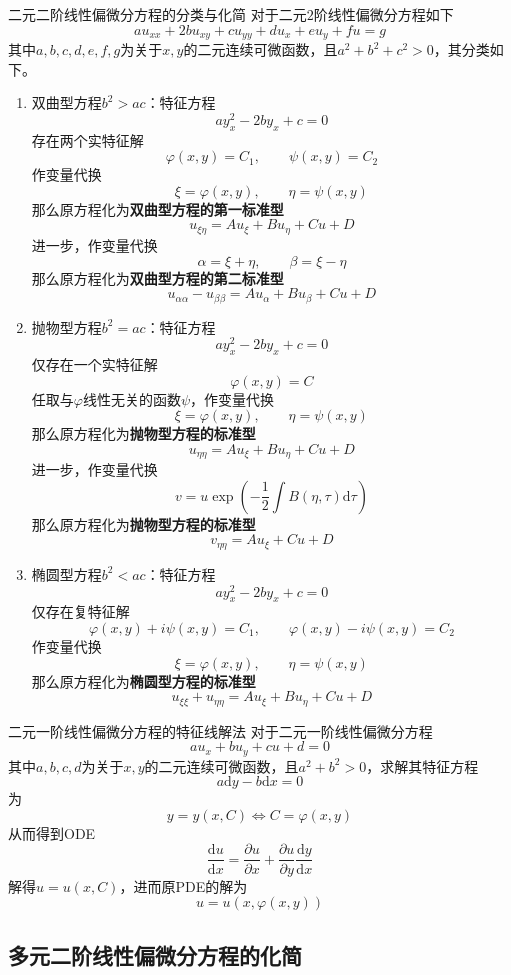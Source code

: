 \documentclass[lang = cn, scheme = chinese, thmcnt = section]{elegantbook}
\newcommand{\dd}{\mathrm{d}}           %
\begin{document}
\begin{theorem}{二元二阶线性偏微分方程的分类与化简}
	对于二元$2$阶线性偏微分方程如下
	$$
	au_{xx}
	+2bu_{xy}
	+cu_{yy}
	+du_x
	+eu_y
	+fu
	=g
	$$
	其中$a,b,c,d,e,f,g$为关于$x,y$的二元连续可微函数，且$a^2+b^2+c^2>0$，其分类如下。
	\begin{enumerate}
		\item 双曲型方程$b^2>ac$：特征方程
		$$
		ay_x^2-2by_x+c=0
		$$
		存在两个实特征解
		$$
		\varphi(x,y)=C_1,\qquad
		\psi(x,y)=C_2
		$$
		作变量代换
		$$
		\xi=\varphi(x,y),\qquad
		\eta=\psi(x,y)
		$$
		那么原方程化为{\bf{双曲型方程的第一标准型}}
		$$
		u_{\xi\eta}=Au_\xi+Bu_\eta+Cu+D
		$$
		进一步，作变量代换
		$$
		\alpha=\xi+\eta,\qquad 
		\beta=\xi-\eta
		$$
		那么原方程化为{\bf{双曲型方程的第二标准型}}
		$$
		u_{\alpha\alpha}-u_{\beta\beta}=Au_\alpha+Bu_\beta+Cu+D
		$$
		\item 抛物型方程$b^2=ac$：特征方程
		$$
		ay_x^2-2by_x+c=0
		$$
		仅存在一个实特征解
		$$
		\varphi(x,y)=C
		$$
		任取与$\varphi$线性无关的函数$\psi$，作变量代换
		$$
		\xi=\varphi(x,y),\qquad
		\eta=\psi(x,y)
		$$
		那么原方程化为{\bf{抛物型方程的标准型}}
		$$
		u_{\eta\eta}=Au_\xi+Bu_\eta+Cu+D
		$$
		进一步，作变量代换
		$$
		v=u\exp\left(-\frac{1}{2}\int B(\eta,\tau)\dd \tau\right)
		$$
		那么原方程化为{\bf{抛物型方程的标准型}}
		$$
		v_{\eta\eta}=Au_\xi+Cu+D
		$$
		\item 椭圆型方程$b^2<ac$：特征方程
		$$
		ay_x^2-2by_x+c=0
		$$
		仅存在复特征解
		$$
		\varphi(x,y)+i\psi(x,y)=C_1,\qquad
		\varphi(x,y)-i\psi(x,y)=C_2
		$$
		作变量代换
		$$
		\xi=\varphi(x,y),\qquad
		\eta=\psi(x,y)
		$$
		那么原方程化为{\bf{椭圆型方程的标准型}}
		$$
		u_{\xi\xi}+u_{\eta\eta}=Au_\xi+Bu_\eta+Cu+D
		$$
	\end{enumerate}
\end{theorem}

\begin{theorem}{二元一阶线性偏微分方程的特征线解法}
	对于二元一阶线性偏微分方程
	$$
	au_x+bu_y+cu+d=0
	$$
	其中$a,b,c,d$为关于$x,y$的二元连续可微函数，且$a^2+b^2>0$，求解其特征方程
	$$
	a\dd y-b\dd x=0
	$$
	为
	$$
	y=y(x,C)\iff C=\varphi(x,y)
	$$
	从而得到ODE
	$$
	\frac{\dd u}{\dd x}=
	\frac{\partial u}{\partial x}+\frac{\partial u}{\partial y}\frac{\dd y}{\dd x}
	$$
	解得$u=u(x,C)$，进而原PDE的解为
	$$
	u=u(x,\varphi(x,y))
	$$
\end{theorem}

\subsection{多元二阶线性偏微分方程的化简}
\end{document}
